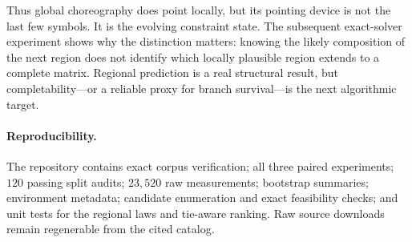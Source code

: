 \documentclass[10pt,twoside]{article}
\theoremstyle{noteplain}
\theoremstyle{definition}
\begin{document}
Thus global choreography does point locally, but its pointing device is not the last few symbols.  It is the evolving constraint state.  The subsequent exact-solver experiment shows why the distinction matters: knowing the likely composition of the next region does not identify which locally plausible region extends to a complete matrix.  Regional prediction is a real structural result, but completability---or a reliable proxy for branch survival---is the next algorithmic target.

\paragraph{Reproducibility.}
The repository contains exact corpus verification; all three paired experiments; $120$ passing split audits; $23{,}520$ raw measurements; bootstrap summaries; environment metadata; candidate enumeration and exact feasibility checks; and unit tests for the regional laws and tie-aware ranking.  Raw source downloads remain regenerable from the cited catalog.

\enlargethispage{3\baselineskip}


\end{document}
